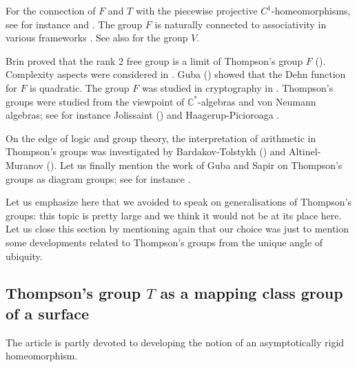 \documentclass[twoside]{irmaems}
\theoremstyle{plain}
\theoremstyle{definition}
\theoremstyle{remark}
\newcommand{\C}{{\mathbb{C}}}
\begin{document}
\vspace{0.1cm}\noindent 
For the connection of $F$ and $T$ with the piecewise projective $C^1$-homeomorphisms, see for instance \cite{Gr,gr} and \cite{ma}.
The group $F$ is naturally connected to associativity in various frameworks
\cite{de2,GeGu,FL}. See also \cite{bri1,bri2} for the group $V$.

\vspace{0.1cm}\noindent 
Brin proved that the rank 2 free group is a limit of Thompson's group $F$
 (\cite{brin3}). Complexity
aspects were considered in \cite{birget}. Guba (\cite{Gu2}) 
showed that the Dehn function
for $F$ is quadratic. 
The group $F$ was studied in cryptography in \cite{RST,matucci,BT}.
Thompson's groups were studied from the viewpoint of $\C^*$-algebras and von
Neumann algebras; see for instance Jolissaint (\cite{Joli}) and 
Haagerup-Picioroaga \cite{HaagPi}.


\vspace{0.1cm}\noindent 
On the edge of logic and group theory, the interpretation of arithmetic 
in Thompson's groups 
was investigated by Bardakov-Tolstykh (\cite{BT}) and Altinel-Muranov (\cite{AM}).
Let us finally mention the work of Guba and Sapir on Thompson's groups
as diagram groups; see for instance \cite{GuS}.

\vspace{0.1cm}\noindent 
Let us emphasize here that we avoided to speak on
generalisations of Thompson's groups: 
this topic is pretty large and we think it would
not  be at its place here.
Let us close this section by mentioning again that our
choice was just to mention some developments related 
to Thompson's groups from the unique angle of ubiquity.



   




\subsection{Thompson's group  $T$ as a mapping class group 
of a surface}\label{thommcg}

The article \cite{ka-se} is partly devoted to developing the notion of an asymptotically rigid homeomorphism.
\end{document}
